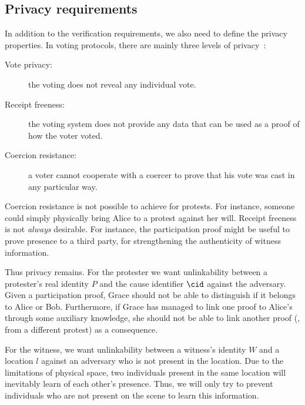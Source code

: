 \subsection{Privacy requirements}%
\label{privacy-properties}

In addition to the verification requirements, we also need to define the privacy properties.
In voting protocols, there are mainly three levels of 
privacy~\cite{VerifyingPrivacyPropertiesOfVotingProtocols}:
\begin{description}
  \item[Vote privacy:] the voting does not reveal any individual vote.
  \item[Receipt freeness:] the voting system does not provide any data that can be used as a proof of how the voter voted.
  \item[Coercion resistance:] a voter cannot cooperate with a coercer to prove that his vote was cast in any particular way.
\end{description}

Coercion resistance is not possible to achieve for protests.
For instance, someone could simply physically bring Alice to a protest against her will.
Receipt freeness is not \emph{always} desirable.
For instance, the participation proof might be useful to prove presence to a third party, \eg for strengthening the authenticity of witness information.

Thus privacy remains.
For the protester we want unlinkability between a protester's real identity \(P\) and the cause identifier \(\cid\) against the adversary.
Given a participation proof, Grace should not be able to distinguish if it belongs to Alice or Bob.
Furthermore, if Grace has managed to link one proof to Alice's through some auxiliary knowledge, she should not be able to link another proof (\eg, from a different protest) as a consequence.

For the witness, we want unlinkability between a witness's identity \(W\) and a location \(l\) against an adversary who is not present in the location.
Due to the limitations of physical space, two individuals present in the same location will inevitably learn of each other's presence.
Thus, we will only try to prevent individuals who are not present on the scene to learn this information.

